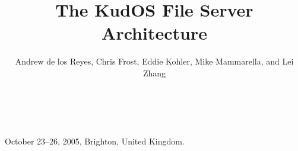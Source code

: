 \documentclass[10pt,twocolumn]{article}
\begin{document}
\normalsize
{} {October 23--26, 2005, Brighton, United Kingdom.}

\title{\sffamily\textbf{The KudOS File Server Architecture}}


\author{\sffamily Andrew de los Reyes, Chris Frost, Eddie Kohler, Mike
Mammarella, and Lei Zhang \\
\noalign{\vskip2pt}
 \\
\noalign{\vskip2pt}
 \\
\noalign{\vskip-.25in}
\null}
\date{}
\maketitle

\def\assast{\raise.2ex\hbox{$^\ast$}}









\end{document}
